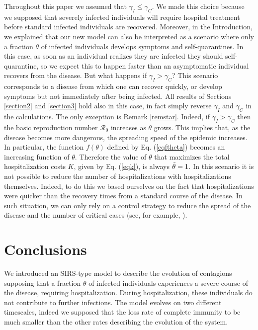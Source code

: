 \documentclass[11pt,reqno]{amsart}
\theoremstyle{boldremark}
\begin{document}
\noindent Throughout this paper we assumed that $\gamma_I \le\gamma_C$. We made this choice because we supposed that severely infected individuals will require hospital treatment before standard infected individuals are recovered. Moreover, in the Introduction, we explained that our new model can also be interpreted as a scenario where only a fraction $\theta$ of infected individuals develops symptoms and self-quarantines. In this case, as soon as an individual realizes they are infected they should self-quarantine, so we expect this to happen faster than an asymptomatic individual recovers from the disease. But what happens if $\gamma_I > \gamma_C$? This scenario corresponds to a disease from which one can recover quickly, or develop symptoms but not immediately after being infected. All results of Sections \ref{section2} and \ref{section3} hold also in this case, in fact simply reverse $\gamma_I$ and $\gamma_C$ in the calculations. The only exception is Remark \ref{remstar}. Indeed, if $\gamma_I > \gamma_C$ then the basic reproduction number $\mathcal{R}_0$ increases as $\theta$ grows. This implies that, as the disease becomes more dangerous, the spreading speed of the epidemic increases. In particular, the function $f(\theta)$ defined by Eq. (\ref{eqftheta}) becomes an increasing function of $\theta$. Therefore the value of $\theta$ that maximizes the total hospitalization costs $K$, given by Eq. (\ref{eqk}), is always $\Tilde{\theta}=1$. In this scenario it is not possible to reduce the number of hospitalizations with hospitalizations themselves. Indeed, to do this we based ourselves on the fact that hospitalizations were quicker than the recovery times from a standard course of the disease. In such situation, we can only rely on a control strategy to reduce the spread of the disease and the number of critical cases (see, for example, \cite{27,19,18, 25, 33, 26}). 

\section{Conclusions} \label{section5}

\noindent We introduced an SIRS-type model to describe the evolution of contagions supposing that a fraction $\theta$ of infected individuals experiences a severe course of the disease, requiring hospitalization. During hospitalization, these individuals do not contribute to further infections. The model evolves on two different timescales, indeed we supposed that the loss rate of complete immunity to be much smaller than the other rates describing the evolution of the system. 
\end{document}
